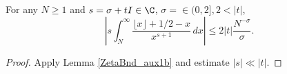 \begin{lemma}
\label{ZetaBnd_aux1}
\leanok
For any $N\ge1$ and $s = \sigma + tI \in \C$, $\sigma=\in(0,2], 2 < |t|$,
  $$
  \left| s\int_N^\infty \frac{\lfloor x\rfloor + 1/2 - x}{x^{s+1}} \, dx \right|
  \le 2 |t| \frac{N^{-\sigma}}{\sigma}.
  $$
\end{lemma}
\begin{proof}
\leanok
Apply Lemma \ref{ZetaBnd_aux1b} and estimate $|s|\ll |t|$.
\end{proof}
